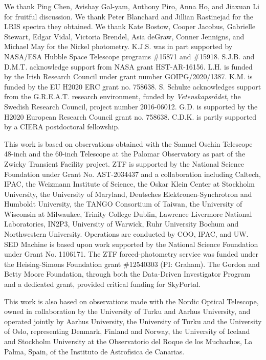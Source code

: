 \documentclass[twocolumn]{aastex631}
\begin{document}
\begin{CJK*}{UTF8}{gbsn}

We thank Ping Chen, Avishay Gal-yam, Anthony Piro, Anna Ho, and Jiaxuan Li for fruitful discussion. We thank Peter Blanchard and Jillian Rastinejad for the LRIS spectra they obtained. We thank Kate Bostow, Cooper Jacobus, Gabrielle Stewart, Edgar Vidal, Victoria Brendel, Asia deGraw, Conner Jennigns, and Michael May for the Nickel photometry. K.J.S. was in part supported by NASA/ESA Hubble Space Telescope programs \#15871 and \#15918. S.J.B. and D.M.T. acknowledge support from NASA grant HST-AR-16156. L.H. is funded by the Irish Research Council under grant number GOIPG/2020/1387. K.M. is funded by the EU H2020 ERC grant no. 758638. S. Schulze acknowledges support from the G.R.E.A.T. research environment, funded by {\em Vetenskapsr\aa det},  the Swedish Research Council, project number 2016-06012. G.D. is supported by the H2020 European Research Council grant no. 758638. C.D.K. is partly supported by a CIERA postdoctoral fellowship.

This work is based on observations obtained with the Samuel Oschin Telescope 48-inch and the 60-inch Telescope at the Palomar Observatory as part of the Zwicky Transient Facility project. ZTF is supported by the National Science Foundation under Grant No. AST-2034437 and a collaboration including Caltech, IPAC, the Weizmann Institute of Science, the Oskar Klein Center at Stockholm University, the University of Maryland, Deutsches Elektronen-Synchrotron and Humboldt University, the TANGO Consortium of Taiwan, the University of Wisconsin at Milwaukee, Trinity College Dublin, Lawrence Livermore National Laboratories, IN2P3, University of Warwick, Ruhr University Bochum and Northwestern University. Operations are conducted by COO, IPAC, and UW.
SED Machine is based upon work supported by the National Science Foundation under Grant No. 1106171. The ZTF forced-photometry service was funded under the Heising-Simons Foundation grant \#12540303 (PI: Graham). The Gordon and Betty Moore Foundation, through both the Data-Driven Investigator Program and a dedicated grant, provided critical funding for SkyPortal.

This work is also based on observations made with the Nordic Optical Telescope, owned in collaboration by the University of Turku and Aarhus University, and operated jointly by Aarhus University, the University of Turku and the University of Oslo, representing Denmark, Finland and Norway, the University of Iceland and Stockholm University at the Observatorio del Roque de los Muchachos, La Palma, Spain, of the Instituto de Astrofisica de Canarias.


\end{CJK*}
\end{document}
